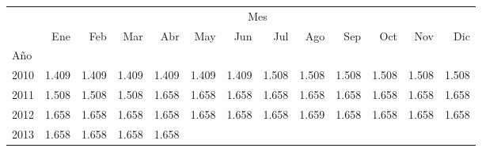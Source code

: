 \begin{tabular}{lllllllllllll}
\cline{1-13}
\multicolumn{1}{c}{} &
  \multicolumn{12}{|c}{Mes} \\
\multicolumn{1}{c}{} &
  \multicolumn{1}{|r}{Ene} &
  \multicolumn{1}{r}{Feb} &
  \multicolumn{1}{r}{Mar} &
  \multicolumn{1}{r}{Abr} &
  \multicolumn{1}{r}{May} &
  \multicolumn{1}{r}{Jun} &
  \multicolumn{1}{r}{Jul} &
  \multicolumn{1}{r}{Ago} &
  \multicolumn{1}{r}{Sep} &
  \multicolumn{1}{r}{Oct} &
  \multicolumn{1}{r}{Nov} &
  \multicolumn{1}{r}{Dic} \\
\cline{1-13}
\multicolumn{1}{l}{Año} &
  \multicolumn{1}{|r}{} &
  \multicolumn{1}{r}{} &
  \multicolumn{1}{r}{} &
  \multicolumn{1}{r}{} &
  \multicolumn{1}{r}{} &
  \multicolumn{1}{r}{} &
  \multicolumn{1}{r}{} &
  \multicolumn{1}{r}{} &
  \multicolumn{1}{r}{} &
  \multicolumn{1}{r}{} &
  \multicolumn{1}{r}{} &
  \multicolumn{1}{r}{} \\
\multicolumn{1}{l}{\hspace{1em}2010} &
  \multicolumn{1}{|r}{1.409} &
  \multicolumn{1}{r}{1.409} &
  \multicolumn{1}{r}{1.409} &
  \multicolumn{1}{r}{1.409} &
  \multicolumn{1}{r}{1.409} &
  \multicolumn{1}{r}{1.409} &
  \multicolumn{1}{r}{1.508} &
  \multicolumn{1}{r}{1.508} &
  \multicolumn{1}{r}{1.508} &
  \multicolumn{1}{r}{1.508} &
  \multicolumn{1}{r}{1.508} &
  \multicolumn{1}{r}{1.508} \\
\multicolumn{1}{l}{\hspace{1em}2011} &
  \multicolumn{1}{|r}{1.508} &
  \multicolumn{1}{r}{1.508} &
  \multicolumn{1}{r}{1.508} &
  \multicolumn{1}{r}{1.658} &
  \multicolumn{1}{r}{1.658} &
  \multicolumn{1}{r}{1.658} &
  \multicolumn{1}{r}{1.658} &
  \multicolumn{1}{r}{1.658} &
  \multicolumn{1}{r}{1.658} &
  \multicolumn{1}{r}{1.658} &
  \multicolumn{1}{r}{1.658} &
  \multicolumn{1}{r}{1.658} \\
\multicolumn{1}{l}{\hspace{1em}2012} &
  \multicolumn{1}{|r}{1.658} &
  \multicolumn{1}{r}{1.658} &
  \multicolumn{1}{r}{1.658} &
  \multicolumn{1}{r}{1.658} &
  \multicolumn{1}{r}{1.658} &
  \multicolumn{1}{r}{1.658} &
  \multicolumn{1}{r}{1.658} &
  \multicolumn{1}{r}{1.659} &
  \multicolumn{1}{r}{1.658} &
  \multicolumn{1}{r}{1.658} &
  \multicolumn{1}{r}{1.658} &
  \multicolumn{1}{r}{1.658} \\
\multicolumn{1}{l}{\hspace{1em}2013} &
  \multicolumn{1}{|r}{1.658} &
  \multicolumn{1}{r}{1.658} &
  \multicolumn{1}{r}{1.658} &
  \multicolumn{1}{r}{1.658} &

\end{tabular}
